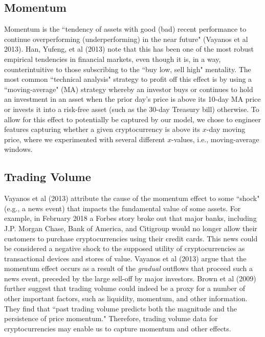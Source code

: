 \documentclass[12pt,twoside]{article}
\begin{document}
\subsection{Momentum}
Momentum is the ``tendency of assets with good (bad) recent performance to continue overperforming (underperforming) in the near future" (Vayanos et al 2013). Han, Yufeng, et al (2013) note that this has been one of the most robust empirical tendencies in financial markets, even though it is, in a way, counterintuitive to those subscribing to the ``buy low, sell high" mentality. The most common ``technical analysis" strategy to profit off this effect is by using a ``moving-average" (MA) strategy whereby an investor buys or continues to hold an investment in an asset when the prior day's price is above its 10-day MA price or invests it into a risk-free asset (such as the 30-day Treasury bill) otherwise. To allow for this effect to potentially be captured by our model, we chose to engineer features capturing whether a given cryptocurrency is above its $x$-day moving price, where we experimented with several different $x$-values, i.e., moving-average windows.
\subsection{Trading Volume}
Vayanos et al (2013) attribute the cause of the momentum effect to some ``shock" (e.g., a news event) that impacts the fundamental value of some assets. For example, in February 2018 a Forbes story broke out that major banks, including J.P. Morgan Chase, Bank of America, and Citigroup would no longer allow their customers to purchase cryptocurrencies using their credit cards. This news could be considered a negative shock to the supposed utility of cryptocurrencies as transactional devices and stores of value. Vayanos et al (2013) argue that the momentum effect occurs as a result of the \textit{gradual} outflows that proceed such a news event, preceded by the large sell-off by major investors. Brown et al (2009) further suggest that trading volume could indeed be a proxy for a number of other important factors, such as liquidity, momentum, and other information. They find that ``past trading volume predicts both the magnitude and the persistence of price momentum." Therefore, trading volume data for cryptocurrencies may enable us to capture momentum and other effects.
\end{document}
